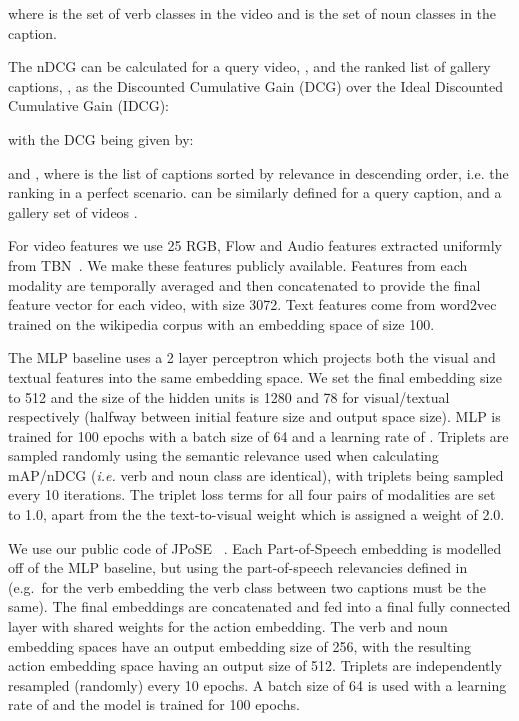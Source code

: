 \RequirePackage{amsmath} \documentclass[runningheads]{llncs}
\newcommand{\chParagraph}[1]{\noindent {\textbf{#1.}} \hspace{6pt}}
\begin{document}
where  is the set of verb classes in the video and  is the set of noun classes in the caption.

The nDCG can be calculated for a query video, , and the ranked list of gallery captions, , as the Discounted Cumulative Gain (DCG) over the Ideal Discounted Cumulative Gain (IDCG):

with the DCG being given by:

and , where  is the list of captions sorted by relevance in descending order, i.e. the ranking in a perfect scenario.  can be similarly defined for a query caption,  and a gallery set of videos .

\chParagraph{Implementation and Training Details}
For video features we use 25 RGB, Flow and Audio features extracted uniformly from TBN~\cite{kazakos2019epic}.
We make these features publicly available.
Features from each modality are temporally averaged and then concatenated to provide the final feature vector for each video, with size 3072.
Text features come from word2vec~\cite{mikolov2013efficient} trained on the wikipedia corpus with an embedding space of size 100.

The MLP baseline uses a 2 layer perceptron which projects both the visual and textual features into the same embedding space.
We set the final embedding size to 512 and the size of the hidden units is 1280 and 78 for visual/textual respectively (halfway between initial feature size and output space size).
MLP is trained for 100 epochs with a batch size of 64 and a learning rate of .
Triplets are sampled randomly using the semantic relevance used when calculating mAP/nDCG (\emph{i.e.} verb and noun class are identical), with triplets being sampled every 10 iterations.
The triplet loss terms for all four pairs of modalities are set to 1.0, apart from the the text-to-visual weight which is assigned a weight of 2.0.


We use our public code of JPoSE~\cite{wray2019fine} . 
Each Part-of-Speech embedding is modelled off of the MLP baseline, but using the part-of-speech relevancies defined in~\cite{wray2019fine} (e.g.~for the verb embedding the verb class between two captions must be the same).
The final embeddings are concatenated and fed into a final fully connected layer with shared weights for the action embedding.
The verb and noun embedding spaces have an output embedding size of 256, with the resulting action embedding space having an output size of 512.
Triplets are independently resampled (randomly) every 10 epochs.
A batch size of 64 is used with a learning rate of  and the model is trained for 100 epochs.
\end{document}
